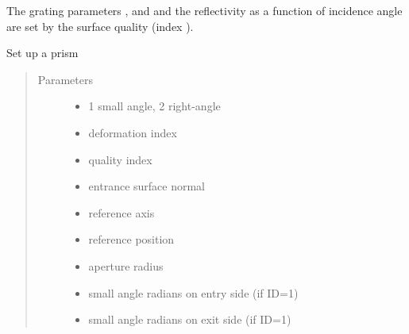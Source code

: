 \documentclass[letterpaper,10pt,english]{sphinxmanual}
\begin{document}
\begin{fulllineitems}
\begin{quote}
\begin{description}
\end{description}\end{quote}

The grating parameters ,  and  and the
reflectivity as a function of incidence angle are set by
the surface quality (index ).

\end{fulllineitems}


\begin{fulllineitems}
\label{\detokenize{xsrt_functions:xsrt.prism}}
Set up a prism
\begin{quote}\begin{description}
\item[{Parameters}] \leavevmode\begin{itemize}
\item {} 
 \textendash{} 1 small angle, 2 right-angle

\item {} 
 \textendash{} deformation index

\item {} 
 \textendash{} quality index

\item {} 
 \textendash{} entrance surface normal

\item {} 
 \textendash{} reference axis

\item {} 
 \textendash{} reference position

\item {} 
 \textendash{} aperture radius

\item {} 
 \textendash{} small angle radians on entry side (if ID=1)

\item {} 
 \textendash{} small angle radians on exit side (if ID=1)


\end{itemize}
\end{description}
\end{quote}
\end{fulllineitems}
\end{document}
